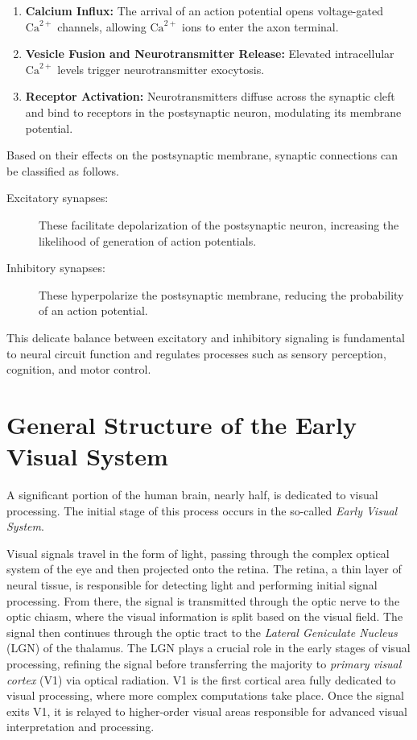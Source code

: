 \begin{enumerate}
    \item \textbf{Calcium Influx:} The arrival of an action potential opens voltage-gated 
    $\text{Ca}^{2+}$ channels, allowing $\text{Ca}^{2+}$ ions to enter the axon terminal.
    \item \textbf{Vesicle Fusion and Neurotransmitter Release:} Elevated intracellular $\text{Ca}^{2+}$ levels trigger neurotransmitter exocytosis.
    \item \textbf{Receptor Activation:} Neurotransmitters diffuse across the synaptic cleft and bind to receptors in the postsynaptic neuron, modulating its membrane potential. 
\end{enumerate}

Based on their effects on the postsynaptic membrane, synaptic connections can be classified as follows.
\begin{description}
    \item[Excitatory synapses:] These facilitate depolarization of the postsynaptic neuron, increasing the likelihood of generation of action potentials.
    \item[Inhibitory synapses:] These hyperpolarize the postsynaptic membrane, reducing the probability of an action potential.
\end{description}

This delicate balance between excitatory and inhibitory signaling is fundamental to neural circuit function and regulates processes such as sensory perception, cognition, and motor control.

\section{General Structure of the Early Visual System}
\label{sec:general_structure}
A significant portion of the human brain, nearly half, is dedicated to visual processing. 
The initial stage of this process occurs in the so-called \emph{Early Visual System}.

Visual signals travel in the form of light, passing through the complex optical
system of the eye and then projected onto the retina. The retina, a thin layer of neural tissue, 
is responsible for detecting light and performing initial signal processing. From there, 
the signal is transmitted through the optic nerve to the optic chiasm, where the visual information
is split based on the visual field. The signal then continues through the optic tract
to the \emph{Lateral Geniculate Nucleus} (LGN) of the thalamus. The LGN plays a crucial role
in the early stages of visual processing, refining the signal before transferring the
majority to \emph{primary visual cortex} (V1) via optical radiation. 
V1 is the first cortical area fully dedicated to visual processing, where more complex
computations take place. Once the signal exits V1, it is relayed to higher-order visual
areas responsible for advanced visual interpretation and processing.

